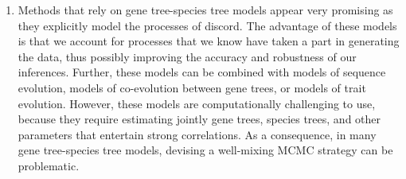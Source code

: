 \begin{enumerate}
\item Methods that rely on gene tree-species tree models appear very promising as they explicitly model the processes of discord.
The advantage of these models is that we account for processes that we know have taken a part in generating the data, thus possibly improving the accuracy and robustness of our inferences. 
Further, these models can be combined with \EG models of sequence evolution, models of co-evolution between gene trees, or models of trait evolution.
However, these models are computationally challenging to use, because they require estimating jointly gene trees, species trees, and other parameters that entertain strong correlations.
As a consequence, in many gene tree-species tree models, devising a well-mixing MCMC strategy can be problematic. 
\end{enumerate}


%
%

